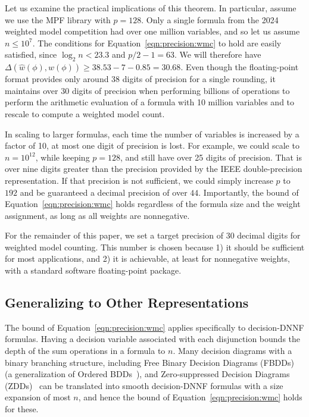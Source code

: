 \documentclass[letterpaper,USenglish,cleveref, autoref, thm-restate]{lipics-v2021}
\newcommand{\approximate}[1]{\hat{#1}}
\newcommand{\approxw}{\approximate{w}}
\newcommand{\digitprecision}{\Delta}
\begin{document}
Let us examine the practical implications of this theorem.  In
particular, assume we use the MPF library with $p=128$.  Only a single
formula from the 2024 weighted model competition had over one million
variables, and so let us assume  $n \leq 10^7$.  The
conditions for Equation~\ref{eqn:precision:wmc} to hold are easily
satisfied, since $\log_2 n < 23.3$ and $p/2-1 = 63$.  We will
therefore have
$\digitprecision(\approxw(\phi), w(\phi)) \geq 38.53 - 7 - 0.85 = 30.68$.
Even though the floating-point format
provides only around 38 digits of precision for a single rounding,
it maintains over 30 digits of precision when performing billions of operations to
perform the arithmetic evaluation of a formula with 10
million variables and to rescale to compute a weighted model count.

In scaling to larger formulas, each time
the number of variables is increased by a factor of 10, at most one
digit of precision is lost.  For example, we could scale to $n=10^{12}$, while keeping $p=128$, and still have over 25 digits of precision.  That is over nine digits greater than the precision
provided by the IEEE double-precision representation.  If that precision is not sufficient, we could simply increase $p$ to $192$ and be guaranteed a decimal precision of over $44$.
Importantly, the bound of Equation~\ref{eqn:precision:wmc} holds regardless of the formula size and the weight assignment, 
as long as all weights are nonnegative.

For the remainder of this paper, we set a target precision of 30 decimal digits for
weighted model counting.  This number is chosen because 1) it should be
sufficient for most applications, and 2) it
is achievable, at least for nonnegative weights, with a standard software floating-point package.

\subsection{Generalizing to Other Representations}
\label{sect:ddnnf}

The bound of Equation~\ref{eqn:precision:wmc} applies specifically to decision-DNNF
formulas.  Having a decision variable associated with each disjunction
bounds the depth of the sum operations in a formula to $n$.  Many
decision diagrams with a binary branching structure, including Free
Binary Decision Diagrams (FBDDs)~\cite{wegener:siam:2000}
(a generalization of Ordered BDDs~\cite{bryant:ieeetc:1986,knuth:bdd:2011}), and Zero-suppressed Decision
Diagrams (ZDDs)~\cite{minato:sttt:2001,minato:ijcai:2007} can be
translated into smooth decision-DNNF formulas with a size expansion of
most $n$, and hence the bound of Equation~\ref{eqn:precision:wmc}
holds for these.
\end{document}
